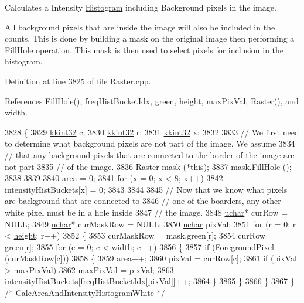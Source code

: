 Calculates a Intensity \hyperlink{class_k_k_b_1_1_histogram}{Histogram} including Background pixels in the image. 

All background pixels that are inside the image will also be included in the counts. This is done by building a mask on the original image then performing a Fill\+Hole operation. This mask is then used to select pixels for inclusion in the histogram. 

Definition at line 3825 of file Raster.\+cpp.



References Fill\+Hole(), freq\+Hist\+Bucket\+Idx, green, height, max\+Pix\+Val, Raster(), and width.


\begin{DoxyCode}
3828 \{
3829   \hyperlink{namespace_k_k_b_a8fa4952cc84fda1de4bec1fbdd8d5b1b}{kkint32}  c;
3830   \hyperlink{namespace_k_k_b_a8fa4952cc84fda1de4bec1fbdd8d5b1b}{kkint32}  r;
3831   \hyperlink{namespace_k_k_b_a8fa4952cc84fda1de4bec1fbdd8d5b1b}{kkint32}  x;
3832 
3833   \textcolor{comment}{// We first need to determine what background pixels are not part of the image.  We assume}
3834   \textcolor{comment}{// that any background pixels that are connected to the border of the image are not part}
3835   \textcolor{comment}{// of the image.}
3836   \hyperlink{class_k_k_b_1_1_raster}{Raster}  mask (*\textcolor{keyword}{this});
3837   mask.FillHole ();
3838 
3839 
3840   area = 0;
3841   \textcolor{keywordflow}{for}  (x = 0;  x < 8;  x++)
3842    intensityHistBuckets[x] = 0;
3843 
3844 
3845   \textcolor{comment}{// Now that we know what pixels are background that are connected to}
3846   \textcolor{comment}{// one of the boarders,  any other white pixel must be in a hole inside}
3847   \textcolor{comment}{// the image.}
3848   \hyperlink{namespace_k_k_b_ace9969169bf514f9ee6185186949cdf7}{uchar}*  curRow     = NULL;
3849   \hyperlink{namespace_k_k_b_ace9969169bf514f9ee6185186949cdf7}{uchar}*  curMaskRow = NULL;
3850   \hyperlink{namespace_k_k_b_ace9969169bf514f9ee6185186949cdf7}{uchar}   pixVal;
3851   \textcolor{keywordflow}{for}  (r = 0; r < \hyperlink{class_k_k_b_1_1_raster_af39ff189de4fbb6de98392e187efafb7}{height}; r++)
3852   \{
3853     curMaskRow = mask.green[r];
3854     curRow = \hyperlink{class_k_k_b_1_1_raster_a2d2238911145488e226cd2e34fc8448c}{green}[r];
3855     \textcolor{keywordflow}{for}  (c = 0; c < \hyperlink{class_k_k_b_1_1_raster_ae0bcc103e191c3421d7692dc69ceb554}{width}; c++)
3856     \{
3857       \textcolor{keywordflow}{if}  (\hyperlink{class_k_k_b_1_1_raster_aa1e1363589e719eb64f0957281b84b6a}{ForegroundPixel} (curMaskRow[c]))
3858       \{
3859         area++;
3860         pixVal = curRow[c];
3861         \textcolor{keywordflow}{if}  (pixVal > \hyperlink{class_k_k_b_1_1_raster_a4f37d3b83826f522f61af0918a1d5546}{maxPixVal})
3862           \hyperlink{class_k_k_b_1_1_raster_a4f37d3b83826f522f61af0918a1d5546}{maxPixVal} = pixVal;
3863         intensityHistBuckets[\hyperlink{_raster_8cpp_af53de902c57701041c19ab771f77f9c2}{freqHistBucketIdx}[pixVal]]++;
3864       \}
3865     \}
3866   \}
3867 \}  \textcolor{comment}{/* CalcAreaAndIntensityHistogramWhite */}
\end{DoxyCode}
